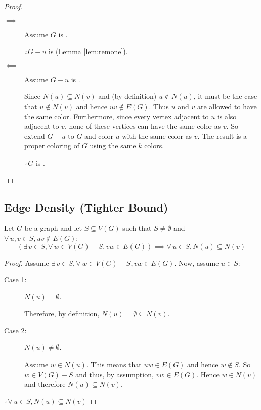 \begin{proof}
  \begin{description}
  \item[]
  \item[\(\implies\)] Assume \(G\) is .

    \(\therefore G-u\) is  (Lemma \ref{lem:remone}).

  \item[\(\impliedby\)] Assume \(G-u\) is .

    Since \(N(u)\subseteq N(v)\) and (by definition) \(u\notin N(u)\), it must be the case that \(u\notin N(v)\) and hence
    \(uv\notin E(G)\).  Thus \(u\) and \(v\) are allowed to have the same color.  Furthermore, since every vertex adjacent to
    \(u\) is also adjacent to \(v\), none of these vertices can have the same color as \(v\).  So extend \(G-u\) to \(G\) and
    color \(u\) with the same color as \(v\).  The result is a proper coloring of \(G\) using the same \(k\) colors.

    \(\therefore G\) is .
  \end{description}
\end{proof}

\subsection{Edge Density (Tighter Bound)}

\begin{lemma}
  \label{lem:neighbor}
  Let \(G\) be a graph and let \(S\subseteq V(G)\) such that \(S\ne\emptyset\) and \(\forall\,u,v\in S,uv\notin E(G)\):
  \[\left(\exists\,v\in S,\forall\,w\in V(G)-S,vw\in E(G)\right)\implies\forall\,u\in S,N(u)\subseteq N(v)\]
\end{lemma}

\begin{proof}
  Assume \(\exists\,v\in S,\forall\,w\in V(G)-S,vw\in E(G)\).  Now, assume \(u\in S\):
  \begin{description}
  \item[Case 1:] \(N(u)=\emptyset\).
      
    Therefore, by definition, \(N(u)=\emptyset\subseteq N(v)\).

  \item[Case 2:] \(N(u)\ne\emptyset\).

    Assume \(w\in N(u)\).  This means that \(uw\in E(G)\) and hence \(w\notin S\).  So \(w\in V(G)-S\) and thus, by assumption,
    \(vw\in E(G)\). Hence \(w\in N(v)\) and therefore \(N(u)\subseteq N(v)\).
  \end{description}

  \(\therefore\forall\,u\in S,N(u)\subseteq N(v)\)
\end{proof}

